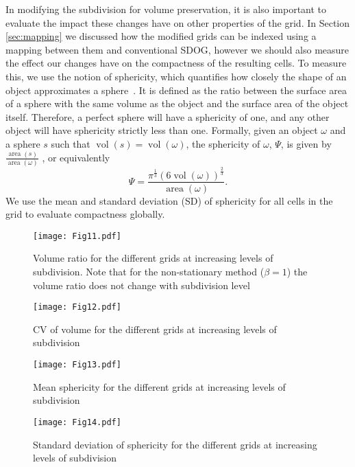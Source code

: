 In modifying the subdivision for volume preservation, it is also important to evaluate the impact these changes have on other properties of the grid.
In Section \ref{sec:mapping} we discussed how the modified grids can be indexed using a mapping between them and conventional SDOG, however we should also measure the effect our changes have on the compactness of the resulting cells.
To measure this, we use the notion of sphericity, which quantifies how closely the shape of an object approximates a sphere~\cite{wadell1935volume}.
It is defined as the ratio between the surface area of a sphere with the same volume as the object and the surface area of the object itself.
Therefore, a perfect sphere will have a sphericity of one, and any other object will have sphericity strictly less than one.
Formally, given an object $\omega$ and a sphere $s$ such that $\operatorname{vol}(s) = \operatorname{vol}(\omega)$, the sphericity of $\omega$, $\Psi$, is given by $\frac{\operatorname{area}(s)}{\operatorname{area}(\omega)}$ , or equivalently 
%
\begin{equation}
\Psi = \frac{\pi^{\frac{1}{3}}\left( 6\operatorname{vol}(\omega) \right)^{\frac{2}{3}}}{\operatorname{area}(\omega)}.
\label{eq:sphericity}
\end{equation}
%
We use the mean and standard deviation (SD) of sphericity for all cells in the grid to evaluate compactness globally.


\begin{figure}[tbp]
	\centering
	\texttt{[image: Fig11.pdf]}
	\caption{Volume ratio for the different grids at increasing levels of subdivision.
		Note that for the non-stationary method ($\beta = 1$) the volume ratio does not change with subdivision level}
	\label{fig:vr}
\end{figure}


\begin{figure}[tbp]
	\centering
	\texttt{[image: Fig12.pdf]}
	\caption{CV of volume for the different grids at increasing levels of subdivision}
	\label{fig:cv}
\end{figure}


\begin{figure}[tbp]
	\centering
	\texttt{[image: Fig13.pdf]}
	\caption{Mean sphericity for the different grids at increasing levels of subdivision}
	\label{fig:sph}
\end{figure}


\begin{figure}[tbp]
	\centering
	\texttt{[image: Fig14.pdf]}
	\caption{Standard deviation of sphericity for the different grids at increasing levels of subdivision}
	\label{fig:sd-sph}
\end{figure}


